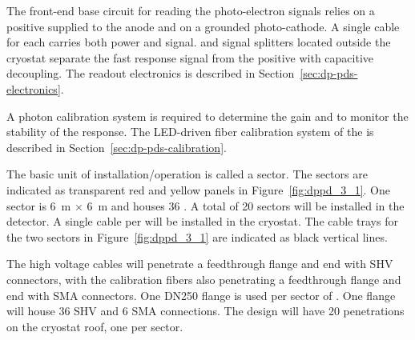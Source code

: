 The front-end  base circuit for reading the photo-electron signals relies on a positive  supplied to the  anode and on a grounded photo-cathode. A single cable for each  carries both power and signal.  and signal splitters located outside the cryostat separate the fast  response signal from the positive  with capacitive decoupling. The  readout electronics is described in Section~\ref{sec:dp-pds-electronics}.

A photon calibration system is required to determine the  gain and to monitor the stability of the  response. The LED-driven fiber calibration system of the  is described in Section~\ref{sec:dp-pds-calibration}. 

The basic unit of installation/operation is called a sector. The sectors are indicated as transparent red and yellow panels in Figure~\ref{fig:dppd_3_1}. One \dual {} sector is \SI{6}{\m} $\times$ \SI{6}{\m} and houses \num{36} . A total of \num{20} sectors will be installed in the detector. A single  cable per  will be installed in the cryostat.
The cable trays for the two sectors in Figure~\ref{fig:dppd_3_1} are indicated as black vertical lines.

The high voltage cables will penetrate a feedthrough flange and end with SHV connectors, with the calibration fibers also penetrating a feedthrough flange and end with SMA connectors. One DN250 flange is used per sector of \dual {}. One flange will house \num{36} SHV and \num{6} SMA connections. The \dual {} design will have \num{20} penetrations on the cryostat roof, one per sector. 

